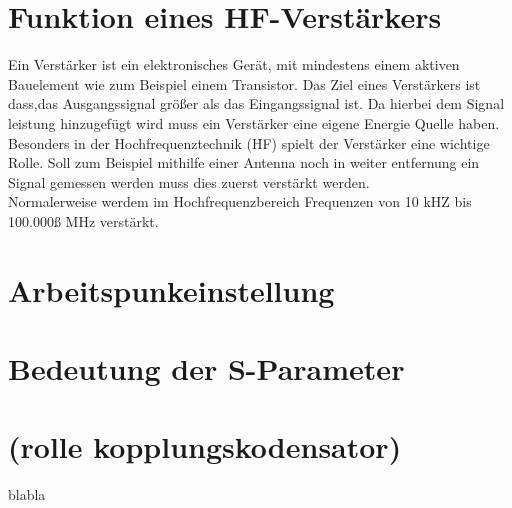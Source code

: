 

\section{Funktion eines HF-Verstärkers}
Ein Verstärker ist ein elektronisches Gerät, mit mindestens einem 
aktiven Bauelement wie zum Beispiel einem Transistor.
Das Ziel eines Verstärkers ist dass,das Ausgangssignal 
größer als das Eingangssignal ist. Da hierbei dem Signal leistung hinzugefügt
wird muss ein Verstärker eine eigene Energie Quelle haben.
\\
Besonders in der Hochfrequenztechnik (HF) spielt der Verstärker eine wichtige
Rolle. Soll zum Beispiel mithilfe einer Antenna noch in weiter entfernung ein Signal
gemessen werden muss dies zuerst verstärkt werden.
\\
Normalerweise werdem im Hochfrequenzbereich Frequenzen von 10 kHZ bis 100.000ß MHz
verstärkt.
\section{Arbeitspunkeinstellung}
\section{Bedeutung der S-Parameter}
\section{(rolle kopplungskodensator)}
blabla 
\clearpage